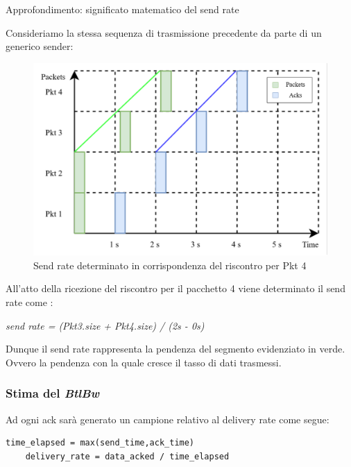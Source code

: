 \begin{approfondimento}{Approfondimento: significato matematico del send rate}

Consideriamo la stessa sequenza di trasmissione precedente da parte di un generico sender:

\begin{figure}[H]

\center
\caption{Send rate determinato in corrispondenza del riscontro per Pkt 4}
\includegraphics[scale=0.3]{chapters/3_bbr/img/send_rate}

\end{figure}

All'atto della ricezione del riscontro per il pacchetto 4 viene determinato il send rate come : \bigskip

\begin{center}

\textit{send rate = (Pkt3.size + Pkt4.size) / (2s - 0s)}

\end{center}

Dunque il send rate rappresenta la pendenza del segmento evidenziato in verde. Ovvero la pendenza con la quale cresce il tasso di dati trasmessi. \bigskip 

\end{approfondimento}

\subsubsection{Stima del \textit{BtlBw}}

Ad ogni ack sarà generato un campione relativo al delivery rate come segue:

\begin{lstlisting}[caption=Delivery rate evaluation]
	time_elapsed = max(send_time,ack_time)
	delivery_rate = data_acked / time_elapsed
\end{lstlisting}

